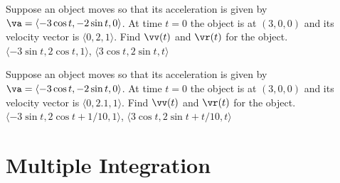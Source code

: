 \begin{multicols}{2}
\problem Suppose an object moves so that its acceleration is given by %
$\va =\langle -3\cos t,-2\sin t,0\rangle$. At time $t=0$ the object
is at $(3,0,0)$ and its velocity vector is $\langle
0,2,1\rangle$. Find $\vv (t)$ and $\vr (t)$ for the object.
\answer
$\langle -3\sin t,2\cos t,1\rangle$,
$\langle 3\cos t, 2\sin t,t\rangle$
\endanswer

\problem Suppose an object moves so that its acceleration is given by %
$\va =\langle -3\cos t,-2\sin t,0\rangle$. At time $t=0$ the object
is at $(3,0,0)$ and its velocity vector is $\langle
0,2.1,1\rangle$. Find $\vv (t)$ and $\vr (t)$ for the object.
\answer
$\langle -3\sin t,2\cos t+1/10,1\rangle$,
$\langle 3\cos t, 2\sin t+t/10,t\rangle$
\endanswer


\end{multicols}

\def\tint#1{\int\int\int_{#1}}
\section{Multiple Integration} %

